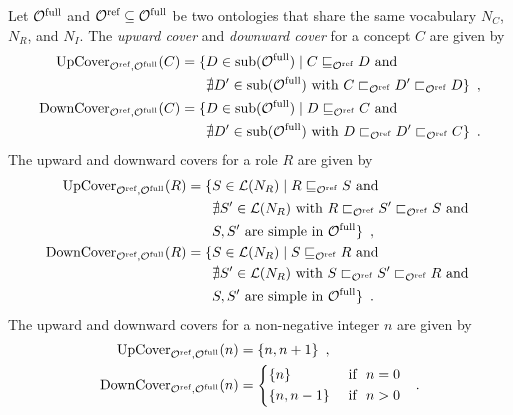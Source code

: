 \begin{definition} \label{def:covers}
  Let $\Omcfull$ and $\Omcref \subseteq \Omcfull$ be two \SROIQ ontologies that share the same vocabulary $N_C$, $N_R$, and $N_I$. The \emph{upward cover} and \emph{downward cover} for a concept $C$ are given by
  \begin{align*}
    \UpC_{\Omcref,\Omcfull}(C) = \{ & D \in \sub(\Omcfull) \mid C \sqsubseteq_\Omcref D \text{ and } \\
    & \nexists D' \in \sub(\Omcfull) \text{ with } C \sqsubset_\Omcref D' \sqsubset_\Omcref D \} \enspace, \\
    \DownC_{\Omcref,\Omcfull}(C) = \{ & D \in \sub(\Omcfull) \mid D \sqsubseteq_\Omcref C \text{ and } \\
    & \nexists D' \in \sub(\Omcfull) \text{ with } D \sqsubset_\Omcref D' \sqsubset_\Omcref C \} \enspace.
  \end{align*}
  The upward and downward covers for a role $R$ are given by
  \begin{align*}
    \UpC_{\Omcref,\Omcfull}(R) = \{ & S \in \Lmc(N_R) \mid R \sqsubseteq_\Omcref S \text{ and } \\
    & \nexists S' \in \Lmc(N_R) \text{ with } R \sqsubset_\Omcref S' \sqsubset_\Omcref S \text{ and } \\
    & S, S' \text{ are simple in } \Omcfull \} \enspace, \\
    \DownC_{\Omcref,\Omcfull}(R) = \{ & S \in \Lmc(N_R) \mid S \sqsubseteq_\Omcref R \text{ and } \\
    & \nexists S' \in \Lmc(N_R) \text{ with } S \sqsubset_\Omcref S' \sqsubset_\Omcref R \text{ and } \\
    & S, S' \text{ are simple in } \Omcfull \} \enspace.
  \end{align*}
  The upward and downward covers for a non-negative integer $n$ are given by
  \begin{align*}
    \UpC_{\Omcref,\Omcfull}(n) &= \{ n, n + 1 \} \enspace, \\
    \DownC_{\Omcref,\Omcfull}(n) &=
    \begin{cases*}
      \{ n \} & \text{ if } $n = 0$ \\
      \{ n, n - 1 \} & \text{ if } $n > 0$
    \end{cases*} \enspace.
  \end{align*}
\end{definition}


